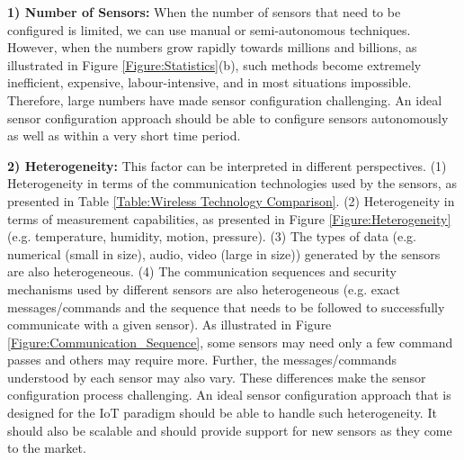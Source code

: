 \documentclass[graybox]{svmult}
\begin{document}
\textbf{1) Number of Sensors:} When the number of sensors that need to be configured is limited, we can use manual  or semi-autonomous techniques. However, when the numbers grow rapidly towards millions and billions, as illustrated in Figure \ref{Figure:Statistics}(b), such methods become extremely inefficient, expensive, labour-intensive, and in most situations impossible. Therefore, large numbers have made sensor configuration challenging. An ideal sensor configuration approach should be able to configure sensors autonomously as well as within a very short time period.





\textbf{2) Heterogeneity:} This factor can be interpreted in different perspectives. (1) Heterogeneity in terms of the communication technologies used by the sensors, as presented in Table \ref{Table:Wireless Technology Comparison}. (2) Heterogeneity in terms of measurement capabilities, as presented in Figure \ref{Figure:Heterogeneity} (e.g. temperature, humidity, motion, pressure). (3) The types of data (e.g. numerical (small in size), audio, video (large in size)) generated by the sensors are also heterogeneous. (4) The communication sequences and security mechanisms used by different sensors are also heterogeneous (e.g. exact messages/commands and the sequence that needs to be followed to successfully communicate with a given sensor). As illustrated in Figure \ref{Figure:Communication_Sequence}, some sensors may need only a few command passes and others may require more. Further, the messages/commands understood by each sensor may also vary. These differences make the sensor configuration process challenging. An ideal sensor configuration approach that is designed for the IoT paradigm should be able to handle such heterogeneity. It should also be scalable and should provide support for new sensors as they come to the market.
\end{document}
